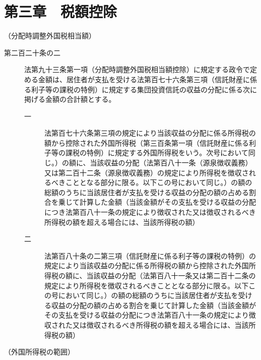 \documentclass[twocolumn,a4j,10pt]{ltjtarticle}
\begin{document}
\section*{第三章　税額控除}
\noindent\hspace{10pt}（分配時調整外国税相当額）
\begin{description}
\item[第二百二十条の二]法第九十三条第一項（分配時調整外国税相当額控除）に規定する政令で定める金額は、居住者が支払を受ける法第百七十六条第三項（信託財産に係る利子等の課税の特例）に規定する集団投資信託の収益の分配に係る次に掲げる金額の合計額とする。
\begin{description}
\item[一]法第百七十六条第三項の規定により当該収益の分配に係る所得税の額から控除された外国所得税（第三百条第一項（信託財産に係る利子等の課税の特例）に規定する外国所得税をいう。次号において同じ。）の額に、当該収益の分配（法第百八十一条（源泉徴収義務）又は第二百十二条（源泉徴収義務）の規定により所得税を徴収されるべきこととなる部分に限る。以下この号において同じ。）の額の総額のうちに当該居住者が支払を受ける収益の分配の額の占める割合を乗じて計算した金額（当該金額がその支払を受ける収益の分配につき法第百八十一条の規定により徴収された又は徴収されるべき所得税の額を超える場合には、当該所得税の額）
\item[二]法第百八十条の二第三項（信託財産に係る利子等の課税の特例）の規定により当該収益の分配に係る所得税の額から控除された外国所得税の額に、当該収益の分配（法第百八十一条又は第二百十二条の規定により所得税を徴収されるべきこととなる部分に限る。以下この号において同じ。）の額の総額のうちに当該居住者が支払を受ける収益の分配の額の占める割合を乗じて計算した金額（当該金額がその支払を受ける収益の分配につき法第百八十一条の規定により徴収された又は徴収されるべき所得税の額を超える場合には、当該所得税の額）
\end{description}
\end{description}
\noindent\hspace{10pt}（外国所得税の範囲）
\end{document}
